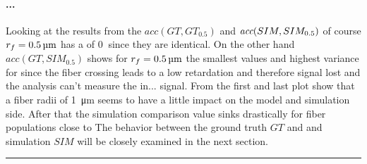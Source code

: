 \paragraph{...}
Looking at the results from the $acc(GT,GT_{0.5})$ and $\textit{acc}{}(SIM,SIM_{0.5})$ of course $\fiberRadius=\SI{0.5}{\micro\meter}$ has a \acc{} of $\SI{0}{}$ since they are identical.
On the other hand $acc(GT,SIM_{0.5})$ shows for $\fiberRadius=\SI{0.5}{\micro\meter}$ the smallest values and highest variance for \acc{} since the fiber crossing leads to a low retardation and therefore signal lost and the analysis can't measure the in... signal.
% 
From the first and last plot show that a fiber radii of \SI{1}{\micro\meter} seems to have a little impact on the model and simulation side.
After that the simulation comparison \acc{} value sinks drastically for fiber populations close to %
% 
The behavior between the ground truth $GT$ and and simulation $SIM$ will be closely examined in the next section.
\par
\noindent\rule{\textwidth}{2pt}
% 
\newpage
% 

